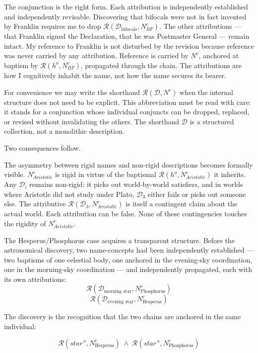 \documentclass[12pt,a4paper]{article}
\begin{document}
The conjunction is the right form. Each attribution is independently established and independently revisable. Discovering that bifocals were not in fact invented by Franklin requires me to drop \(\mathcal{R}(\mathcal{D}_{\text{bifocals}}, N^c_{BF})\). The other attributions --- that Franklin signed the Declaration, that he was Postmaster General --- remain intact. My reference to Franklin is not disturbed by the revision because reference was never carried by any attribution. Reference is carried by \(N^c\), anchored at baptism by \(\mathcal{R}(h^o, N^c_{BF})\), propagated through the chain. The attributions are how I cognitively inhabit the name, not how the name secures its bearer.

For convenience we may write the shorthand \(\mathcal{R}(\mathcal{D}, N^c)\) when the internal structure does not need to be explicit. This abbreviation must be read with care: it stands for a conjunction whose individual conjuncts can be dropped, replaced, or revised without invalidating the others. The shorthand \(\mathcal{D}\) is a structured collection, not a monolithic description.

Two consequences follow.

The asymmetry between rigid names and non-rigid descriptions becomes formally visible. \(N^c_{Aristotle}\) is rigid in virtue of the baptismal \(\mathcal{R}(h^o, N^c_{Aristotle})\) it inherits. Any \(\mathcal{D}_i\) remains non-rigid: it picks out world-by-world satisfiers, and in worlds where Aristotle did not study under Plato, \(\mathcal{D}_3\) either fails or picks out someone else. The attributive \(\mathcal{R}(\mathcal{D}_3, N^c_{Aristotle})\) is itself a contingent claim about the actual world. Each attribution can be false. None of these contingencies touches the rigidity of \(N^c_{Aristotle}\).

The Hesperus/Phosphorus case acquires a transparent structure. Before the astronomical discovery, two name-concepts had been independently established --- two baptisms of one celestial body, one anchored in the evening-sky coordination, one in the morning-sky coordination --- and independently propagated, each with its own attributions: \[\mathcal{R}(\mathcal{D}_{\text{morning star}}, N^{c}_{\text{Phosphorus}})\] \[\mathcal{R}(\mathcal{D}_{\text{evening star}}, N^{c}_{\text{Hesperus}})\]

The discovery is the recognition that the two chains are anchored in the same individual:

\[\mathcal{R}(\textit{star}^{\,o}, N^{c}_{\text{Hesperus}}) \;\wedge\;
\mathcal{R}(\textit{star}^{\,o}, N^{c}_{\text{Phosphorus}})\]
\end{document}
